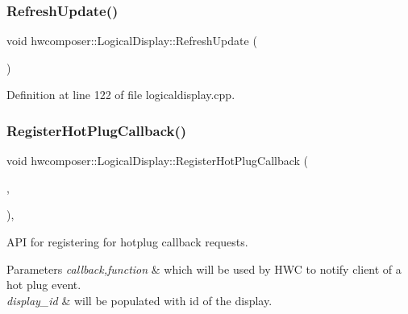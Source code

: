 \subsubsection{\texorpdfstring{Refresh\+Update()}{RefreshUpdate()}}
{\footnotesize\ttfamily void hwcomposer\+::\+Logical\+Display\+::\+Refresh\+Update (\begin{DoxyParamCaption}{ }\end{DoxyParamCaption})}



Definition at line 122 of file logicaldisplay.\+cpp.


\begin{DoxyCode}{0}
\end{DoxyCode}
\mbox{\label{classhwcomposer_1_1LogicalDisplay_a04e78f9e54b66e91bab3f9744a2a18f3}} 
\subsubsection{\texorpdfstring{Register\+Hot\+Plug\+Callback()}{RegisterHotPlugCallback()}}
{\footnotesize\ttfamily void hwcomposer\+::\+Logical\+Display\+::\+Register\+Hot\+Plug\+Callback (\begin{DoxyParamCaption}\item[{std\+::shared\+\_\+ptr$<$ \mbox{\hyperlink{classhwcomposer_1_1HotPlugCallback}{Hot\+Plug\+Callback}} $>$}]{,  }\item[{uint32\+\_\+t}]{ }\end{DoxyParamCaption})\hspace{0.3cm}{\ttfamily [override]}, {\ttfamily [virtual]}}

A\+PI for registering for hotplug callback requests. 
\begin{DoxyParams}{Parameters}
{\em callback,function} & which will be used by H\+WC to notify client of a hot plug event. \\
\hline
{\em display\+\_\+id} & will be populated with id of the display. \\
\hline
\end{DoxyParams}


